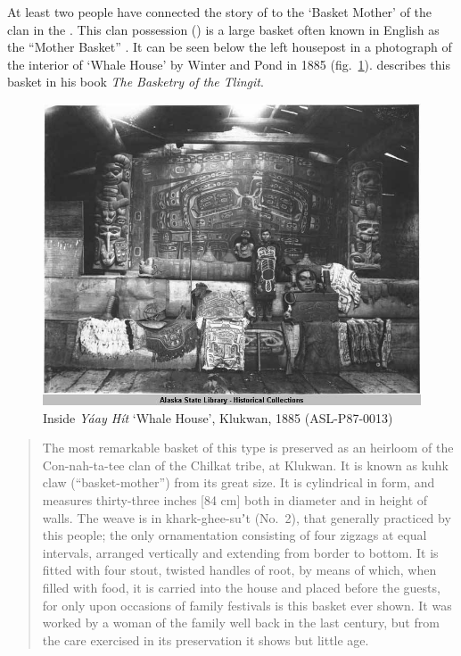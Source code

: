 At least two people have connected the story of  to the  ‘Basket Mother’ of the  clan in the  \parencites[224]{swanton:1909}[69]{paul:1944}.
This clan possession () is a large basket often known in English as the “Mother Basket” \parencite[418]{swanton:1908}.
It can be seen below the left housepost in a photograph of the interior of  ‘Whale House’ by Winter and Pond in 1885 (fig.\ \ref{fig:92-mountain-dweller-whale-house}).
\citeauthor{emmons:1903} describes this basket in his book \textit{The Basketry of the Tlingit}.

\begin{figure}
\centerfloat
\includegraphics[width=\textwidth, keepaspectratio=true]{figures/ASL-P87-0013-cdmg21_634_full.png}
\caption{Inside \textit{Yáay Hít} ‘Whale House’, Klukwan, 1885 (ASL-P87-0013)}
\label{fig:92-mountain-dweller-whale-house}
\end{figure}

\begin{quote}\small
The most remarkable basket of this type is preserved as an heirloom of the Con-nah-ta-tee clan of the Chilkat tribe, at Klukwan.
It is known as kuhk claw (“basket-mother”) from its great size.
It is cylindrical in form, and measures thirty-three inches [84 cm] both in diameter and in height of walls.
The weave is in khark-ghee-suʼt (No.\ 2), that generally practiced by this people; the only ornamentation consisting of four zigzags at equal intervals, arranged vertically and extending from border to bottom.
It is fitted with four stout, twisted handles of root, by means of which, when filled with food, it is carried into the house and placed before the guests, for only upon occasions of family festivals is this basket ever shown.
It was worked by a woman of the family well back in the last century, but from the care exercised in its preservation it shows but little age.
\end{quote}

